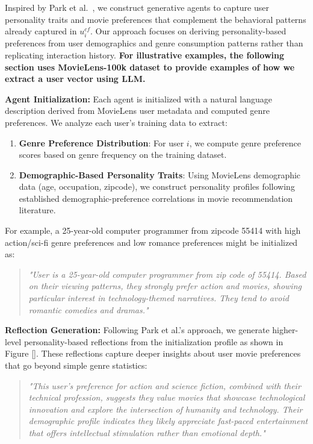 \documentclass[acmsmall]{acmart}
\begin{document}
Inspired by Park et al.~\cite{park2023generative}, we construct generative agents to capture user personality traits and movie preferences that complement the behavioral patterns already captured in $u^{cf}_i$. Our approach focuses on deriving personality-based preferences from user demographics and genre consumption patterns rather than replicating interaction history. \textbf{For illustrative examples, the following section uses MovieLens-100k dataset to provide examples of how we extract a user vector using LLM.} 

\textbf{Agent Initialization:} Each agent is initialized with a natural language description derived from MovieLens user metadata and computed genre preferences. We analyze each user's training data to extract:

\begin{enumerate}
    \item \textbf{Genre Preference Distribution}: For user $i$, we compute genre preference scores based on genre frequency on the training dataset.
    
    \item \textbf{Demographic-Based Personality Traits}: Using MovieLens demographic data (age, occupation, zipcode), we construct personality profiles following established demographic-preference correlations in movie recommendation literature.
\end{enumerate}

For example, a 25-year-old computer programmer from zipcode 55414 with high action/sci-fi genre preferences and low romance preferences might be initialized as:
\begin{quote}
\textit{"User is a 25-year-old computer programmer from zip code of 55414. Based on their viewing patterns, they strongly prefer action and movies, showing particular interest in technology-themed narratives. They tend to avoid romantic comedies and dramas."}
\end{quote}

\textbf{Reflection Generation:} Following Park et al.'s approach, we generate higher-level personality-based reflections from the initialization profile as shown in Figure \ref{}. These reflections capture deeper insights about user movie preferences that go beyond simple genre statistics:

\begin{quote}
\textit{"This user's preference for action and science fiction, combined with their technical profession, suggests they value movies that showcase technological innovation and explore the intersection of humanity and technology. Their demographic profile indicates they likely appreciate fast-paced entertainment that offers intellectual stimulation rather than emotional depth."}
\end{quote}
\end{document}
